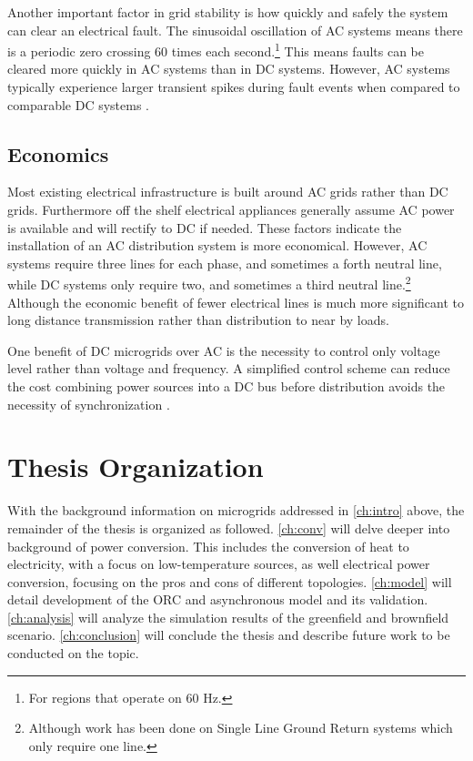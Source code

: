 Another important factor in grid stability is how quickly and safely the system can clear an electrical fault. The sinusoidal oscillation of AC systems means there is a periodic zero crossing 60 times each second.\footnote{For regions that operate on 60 Hz.} This means faults can be cleared more quickly in AC systems than in DC systems.  However, AC systems typically experience larger transient spikes during fault events when compared to comparable DC systems \cite{Estes2011}. 

\subsection{Economics}
Most existing electrical infrastructure is built around AC grids rather than DC grids. Furthermore off the shelf electrical appliances generally assume AC power is available and will rectify to DC if needed. These factors indicate the installation of an AC distribution system is more economical. However, AC systems require three lines for each phase, and sometimes a forth neutral line, while DC systems only require two, and sometimes a third neutral line.\footnote{Although work has been done on Single Line Ground Return systems which only require one line.} Although the economic benefit of fewer electrical lines is much more significant to long distance transmission rather than distribution to near by loads.

One benefit of DC microgrids over AC is the necessity to control only voltage level rather than voltage and frequency. A simplified control scheme can reduce the cost combining power sources into a DC bus before distribution avoids the necessity of synchronization \cite{Lotfi2015}.

\section{Thesis Organization}
With the background information on microgrids addressed in \autoref{ch:intro} above, the remainder of the thesis is organized as followed. \autoref{ch:conv} will delve deeper into background of power conversion. This includes the conversion of heat to electricity, with a focus on low-temperature sources, as well electrical power conversion, focusing on the pros and cons of different topologies. 
\autoref{ch:model} will detail development of the ORC and asynchronous model and its validation. \autoref{ch:analysis} will analyze the simulation results of the greenfield and brownfield scenario.  \autoref{ch:conclusion} will conclude the thesis and describe future work to be conducted on the topic.

\cleardoublepage
